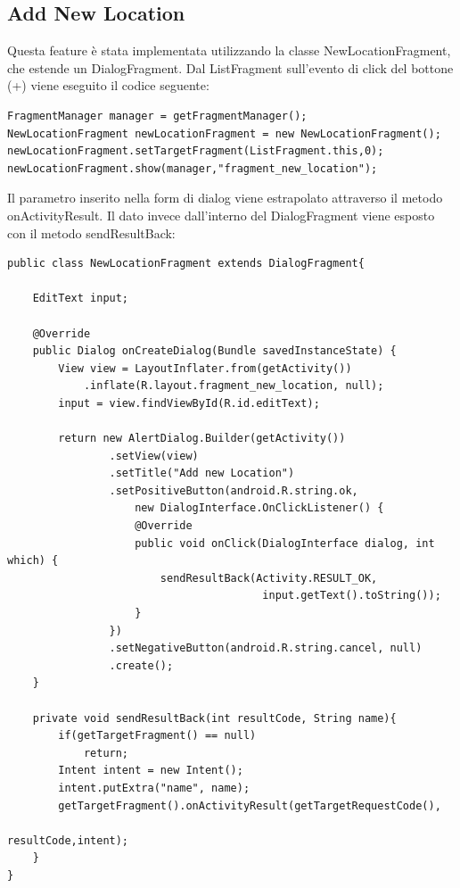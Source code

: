 \documentclass{article}
\begin{document}
\subsection{Add New Location}
Questa feature è stata implementata utilizzando la classe NewLocationFragment, che estende un 
DialogFragment. Dal ListFragment sull'evento di click del bottone (+) viene eseguito il codice seguente:
\begin{lstlisting}
FragmentManager manager = getFragmentManager();
NewLocationFragment newLocationFragment = new NewLocationFragment();
newLocationFragment.setTargetFragment(ListFragment.this,0);
newLocationFragment.show(manager,"fragment_new_location");
\end{lstlisting}
Il parametro inserito nella form di dialog viene estrapolato attraverso il metodo
onActivityResult. Il dato invece dall'interno del DialogFragment viene esposto con il metodo sendResultBack:
\begin{lstlisting}
public class NewLocationFragment extends DialogFragment{

    EditText input;

    @Override
    public Dialog onCreateDialog(Bundle savedInstanceState) {
        View view = LayoutInflater.from(getActivity())
            .inflate(R.layout.fragment_new_location, null);
        input = view.findViewById(R.id.editText);

        return new AlertDialog.Builder(getActivity())
                .setView(view)
                .setTitle("Add new Location")
                .setPositiveButton(android.R.string.ok, 
                    new DialogInterface.OnClickListener() {
                    @Override
                    public void onClick(DialogInterface dialog, int which) {
                        sendResultBack(Activity.RESULT_OK, 
                                        input.getText().toString());
                    }
                })
                .setNegativeButton(android.R.string.cancel, null)
                .create();
    }

    private void sendResultBack(int resultCode, String name){
        if(getTargetFragment() == null)
            return;
        Intent intent = new Intent();
        intent.putExtra("name", name);
        getTargetFragment().onActivityResult(getTargetRequestCode(),
                                                    resultCode,intent);
    }
}
\end{lstlisting}
\end{document}
